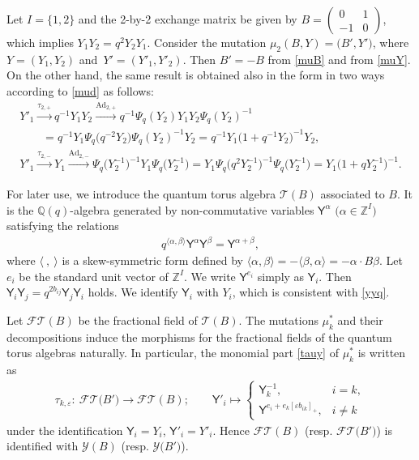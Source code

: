 \documentclass[11pt]{article}
\numberwithin{equation}{section}
\newcommand{\Z}{{\mathbb Z}}
\def\ve{{\varepsilon}}
\newcommand\rY{{\mathsf{Y}}}
\newcommand\bY{Y}
\numberwithin{equation}{section}
\begin{document}
\begin{Example}
 Let $I = \{1,2\}$ and the 2-by-2 exchange matrix be given by
 $B = \left(\begin{smallmatrix}0 & 1 \\ -1 & 0 \end{smallmatrix}\right)$, which implies
 $Y_1Y_2 = q^2Y_2Y_1$. Consider the mutation
 $\mu_2(B,\bY) = \bigl(B', \bY'\bigr)$, where $\bY = (Y_1, Y_2)$ and~${\bY' = (Y'_1, Y'_2)}$. Then $B'=-B$ from \eqref{muB} and
  from \eqref{muY}. On the other hand,
 the same result is obtained also in the form
  in two ways according to
 \eqref{mud} as follows:
\begin{gather*}
Y'_1 \overset{\tau_{2,+}}{\longrightarrow} q^{-1}Y_1Y_2
\overset{\mathrm{Ad}_{2,+}}{\longrightarrow} q^{-1}\Psi_q(Y_2)Y_1Y_2\Psi_q(Y_2)^{-1}\\
\qquad= q^{-1}Y_1\Psi_q\bigl(q^{-2}Y_2\bigr)\Psi_q(Y_2)^{-1}Y_2
= q^{-1}Y_1\bigl(1+q^{-1}Y_2\bigr)^{-1}Y_2,
\\
Y'_1 \overset{\tau_{2,-}}{\longrightarrow} Y_1
\overset{\mathrm{Ad}_{2,-}}{\longrightarrow} \Psi_q\bigl(Y_2^{-1}\bigr)^{-1}Y_1 \Psi_q\bigl(Y_2^{-1}\bigr)
= Y_1\Psi_q\bigl(q^2Y_2^{-1}\bigr)^{-1}\Psi_q\bigl(Y_2^{-1}\bigr) =Y_1\bigl(1+qY^{-1}_2\bigr)^{-1}.
\end{gather*}
\end{Example}

For later use, we introduce the quantum torus algebra $\mathcal{T}(B)$ associated to $B$.
It is the $\mathbb{Q}(q)$-algebra generated by
non-commutative variables $\rY^\alpha$ $\bigl(\alpha \in \Z^{I}\bigr)$ satisfying the
relations
\begin{align}\label{qyy}
q^{\langle \alpha,\beta \rangle} \rY^\alpha \rY^\beta
= \rY^{\alpha + \beta},
\end{align}
where $\langle ~,~ \rangle$ is a skew-symmetric form defined by
$\langle \alpha,\beta \rangle = - \langle \beta,\alpha \rangle =
-\alpha \cdot B \beta$.
Let $e_i$ be the standard unit vector of
$\Z^I$. We write $\rY^{e_i}$ simply as $\rY_i$. Then
$\rY_i \rY_j = q^{2 b_{ij}} \rY_j \rY_i$ holds. We identify $\rY_i$ with
$Y_i$, which is consistent with \eqref{yyq}.

Let $\mathcal{FT}(B)$ be the fractional field of $\mathcal{T}(B)$.
The mutations $\mu_k^{\ast}$
and their decompositions
induce the morphisms for the fractional fields of the quantum torus algebras naturally.
%
In particular, the monomial part \eqref{tauy} of $\mu_k^{\ast}$ is written as
\begin{align}\label{taft}
\tau_{k,\ve} \colon\ \mathcal{FT}\bigl(B'\bigr) \to \mathcal{FT}(B); \qquad
\rY'_i \mapsto \begin{cases}
\rY_k^{-1}, & i= k,
\\
\rY^{e_i + e_k [\ve b_{ik}]_+}, & i \neq k
\end{cases}
\end{align}
under the identification $\rY_i = Y_i$, $\rY'_i = Y'_i$.
Hence $\mathcal{FT}(B)$ (resp. $\mathcal{FT}\bigl(B'\bigr)$) is identified with $\mathcal{Y}(B)$ (resp. $\mathcal{Y}\bigl(B'\bigr)$).
\end{document}

